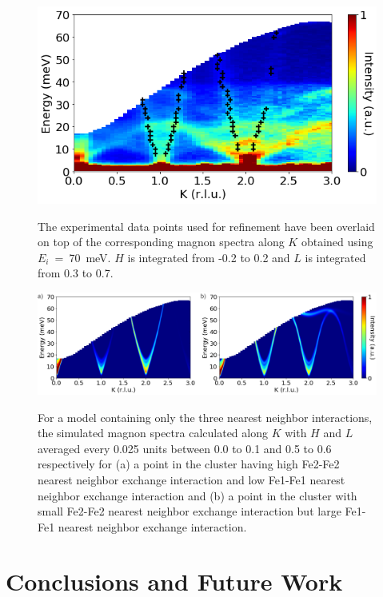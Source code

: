 \documentclass[10pt,doublespacing,edeposit]{uiucthesis2020}
\begin{document}
\begin{mainmatter}
\begin{figure}[h]
\centering\includegraphics[width=0.6\columnwidth]{figures/ch8/exp_data_points_0K0dot5.png} \\
\caption{\label{fig:exp_data_points_01L}
The experimental data points used for refinement have been overlaid on top of the corresponding magnon spectra along $K$ obtained using $E_i$~=~70~meV. $H$ is integrated from -0.2 to 0.2 and $L$ is integrated from 0.3 to 0.7.
} 
\end{figure}


\begin{figure}[h]
\centering\includegraphics[width=\columnwidth]{figures/ch8/suppl_simulated_magnon_spectra_3J.png} \\
\caption{\label{fig:3J_spinw_refinement}
For a model containing only the three nearest neighbor interactions, the simulated magnon spectra calculated along $K$ with $H$ and $L$ averaged every 0.025 units between 0.0 to 0.1 and 0.5 to 0.6 respectively for (a) a point in the cluster having high Fe2-Fe2 nearest neighbor exchange interaction and low Fe1-Fe1 nearest neighbor exchange interaction and (b) a point in the cluster with small Fe2-Fe2 nearest neighbor exchange interaction but large Fe1-Fe1 nearest neighbor exchange interaction.
}
\end{figure}


\chapter{Conclusions and Future Work}


\end{mainmatter}
\end{document}
